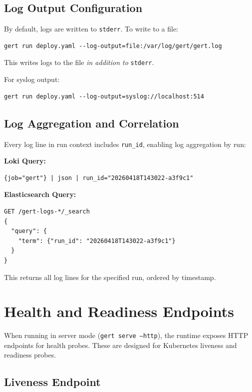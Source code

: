 \subsection{Log Output Configuration}

By default, logs are written to \texttt{stderr}. To write to a file:

\begin{verbatim}
gert run deploy.yaml --log-output=file:/var/log/gert/gert.log
\end{verbatim}

This writes logs to the file \textit{in addition to} \texttt{stderr}.

For syslog output:

\begin{verbatim}
gert run deploy.yaml --log-output=syslog://localhost:514
\end{verbatim}

\subsection{Log Aggregation and Correlation}

Every log line in run context includes \texttt{run\_id}, enabling log aggregation by run:

\textbf{Loki Query:}
\begin{verbatim}
{job="gert"} | json | run_id="20260418T143022-a3f9c1"
\end{verbatim}

\textbf{Elasticsearch Query:}
\begin{verbatim}
GET /gert-logs-*/_search
{
  "query": {
    "term": {"run_id": "20260418T143022-a3f9c1"}
  }
}
\end{verbatim}

This returns all log lines for the specified run, ordered by timestamp.

\section{Health and Readiness Endpoints}

When running in server mode (\texttt{gert serve --http}), the runtime exposes HTTP endpoints for health probes. These are designed for Kubernetes liveness and readiness probes.

\subsection{Liveness Endpoint}

